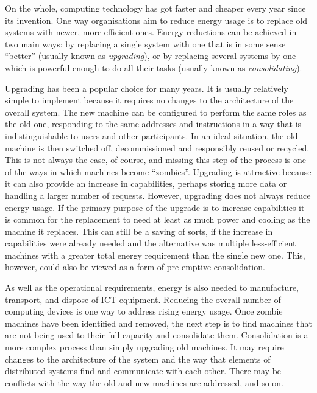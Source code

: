 On the whole, computing technology has got faster and cheaper every year since its invention. One way organisations aim to reduce energy usage is to replace old systems with newer, more efficient ones. Energy reductions can be achieved in two main ways: by replacing a single system with one that is in some sense \enquote{better} (usually known as \emph{\gls{upgrading}}), or by replacing several systems by one which is powerful enough to do all their tasks (usually known as \emph{\gls{consolidating}}).

Upgrading has been a popular choice for many years. It is usually relatively simple to implement because it requires no changes to the architecture of the overall system. The new machine can be configured to perform the same roles as the old one, responding to the same addresses and instructions in a way that is indistinguishable to users and other participants. In an ideal situation, the old machine is then switched off, decommissioned and responsibly reused or recycled. This is not always the case, of course, and missing this step of the process is one of the ways in which machines become \enquote{\gls{zombie}s}. Upgrading is attractive because it can also provide an increase in capabilities, perhaps storing more data or handling a larger number of requests. However, upgrading does not always reduce energy usage. If the primary purpose of the upgrade is to increase capabilities it is common for the replacement to need at least as much power and cooling as the machine it replaces. This can still be a saving of sorts, if the increase in capabilities were already needed and the alternative was multiple less-efficient machines with a greater total energy requirement than the single new one. This, however, could also be viewed as a form of pre-emptive consolidation.

As well as the operational requirements, energy is also needed to manufacture, transport, and dispose of \gls{ICT} equipment. Reducing the overall number of computing devices is one way to address rising energy usage. Once zombie machines have been identified and removed, the next step is to find machines that are not being used to their full capacity and consolidate them. Consolidation is a more complex process than simply upgrading old machines. It may require changes to the architecture of the system and the way that elements of distributed systems find and communicate with each other. There may be conflicts with the way the old and new machines are addressed, and so on.

